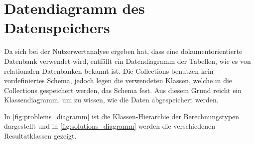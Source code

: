 \section{Datendiagramm des Datenspeichers}\label{datendiagramm_datenspeicher}
Da sich bei der Nutzerwertanalyse ergeben hat, dass eine dokumentorientierte Datenbank verwendet wird, entfällt ein Datendiagramm der Tabellen, wie es von relationalen Datenbanken 
bekannt ist. Die Collections benutzen kein vordefiniertes Schema, jedoch legen die verwendeten Klassen, welche in die Collections gespeichert werden, das Schema fest. Aus diesem Grund 
reicht ein Klassendiagramm, um zu wissen, wie die Daten abgespeichert werden.

In \autoref{fig:problems_diagramm} ist die Klassen-Hierarchie der Berechnungstypen dargestellt und in \autoref{fig:solutions_diagramm} werden die verschiedenen 
Resultatklassen gezeigt.


